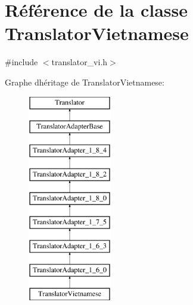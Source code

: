 \hypertarget{class_translator_vietnamese}{}\section{Référence de la classe Translator\+Vietnamese}
\label{class_translator_vietnamese}


{\ttfamily \#include $<$translator\+\_\+vi.\+h$>$}

Graphe d\textquotesingle{}héritage de Translator\+Vietnamese\+:\begin{figure}[H]
\begin{center}
\leavevmode
\includegraphics[height=9.000000cm]{class_translator_vietnamese}
\end{center}
\end{figure}
